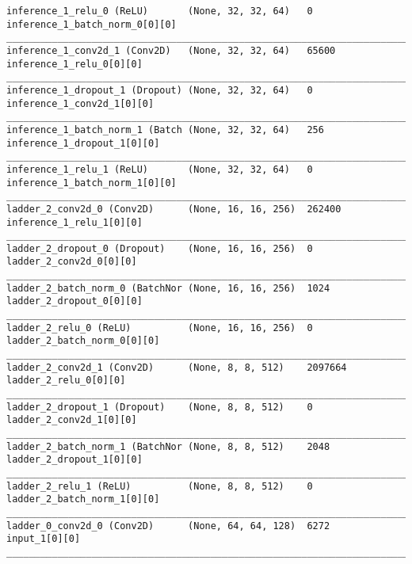 \begin{lstlisting}[caption={CelebA-VLAE Encoder},captionpos=b,basicstyle=\tiny, label={lst:celeba-vlae-encoder}]
inference_1_relu_0 (ReLU)       (None, 32, 32, 64)   0           inference_1_batch_norm_0[0][0]
__________________________________________________________________________________________________
inference_1_conv2d_1 (Conv2D)   (None, 32, 32, 64)   65600       inference_1_relu_0[0][0]
__________________________________________________________________________________________________
inference_1_dropout_1 (Dropout) (None, 32, 32, 64)   0           inference_1_conv2d_1[0][0]
__________________________________________________________________________________________________
inference_1_batch_norm_1 (Batch (None, 32, 32, 64)   256         inference_1_dropout_1[0][0]
__________________________________________________________________________________________________
inference_1_relu_1 (ReLU)       (None, 32, 32, 64)   0           inference_1_batch_norm_1[0][0]
__________________________________________________________________________________________________
ladder_2_conv2d_0 (Conv2D)      (None, 16, 16, 256)  262400      inference_1_relu_1[0][0]
__________________________________________________________________________________________________
ladder_2_dropout_0 (Dropout)    (None, 16, 16, 256)  0           ladder_2_conv2d_0[0][0]
__________________________________________________________________________________________________
ladder_2_batch_norm_0 (BatchNor (None, 16, 16, 256)  1024        ladder_2_dropout_0[0][0]
__________________________________________________________________________________________________
ladder_2_relu_0 (ReLU)          (None, 16, 16, 256)  0           ladder_2_batch_norm_0[0][0]
__________________________________________________________________________________________________
ladder_2_conv2d_1 (Conv2D)      (None, 8, 8, 512)    2097664     ladder_2_relu_0[0][0]
__________________________________________________________________________________________________
ladder_2_dropout_1 (Dropout)    (None, 8, 8, 512)    0           ladder_2_conv2d_1[0][0]
__________________________________________________________________________________________________
ladder_2_batch_norm_1 (BatchNor (None, 8, 8, 512)    2048        ladder_2_dropout_1[0][0]
__________________________________________________________________________________________________
ladder_2_relu_1 (ReLU)          (None, 8, 8, 512)    0           ladder_2_batch_norm_1[0][0]
__________________________________________________________________________________________________
ladder_0_conv2d_0 (Conv2D)      (None, 64, 64, 128)  6272        input_1[0][0]
__________________________________________________________________________________________________

\end{lstlisting}
